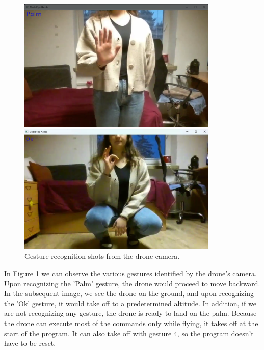 \begin{figure}[ht]
	\centering
	\begin{minipage}{0.5\textwidth}
		\centering
		\includegraphics[width=0.85\textwidth]{images/palm_drone.png}
	\end{minipage}%
	\begin{minipage}{0.5\textwidth}
		\centering
		\includegraphics[width=0.85\textwidth]{images/ok_drone.png}
	\end{minipage}
	\caption{Gesture recognition shots from the drone camera.}
	\label{fig:drone_detections} %
\end{figure}

In Figure \ref{fig:drone_detections} we can observe the various gestures identified by the drone's camera. Upon recognizing the 'Palm' gesture, the drone would proceed to move backward. In the subsequent image, we see the drone on the ground, and upon recognizing the 'Ok' gesture, it would take off to a predetermined altitude.
In addition, if we are not recognizing any gesture, the drone is ready to land on the palm. Because the drone can execute most of the commands only while flying, it takes off at the start of the program. It can also take off with gesture 4, so the program doesn't have to be reset.


